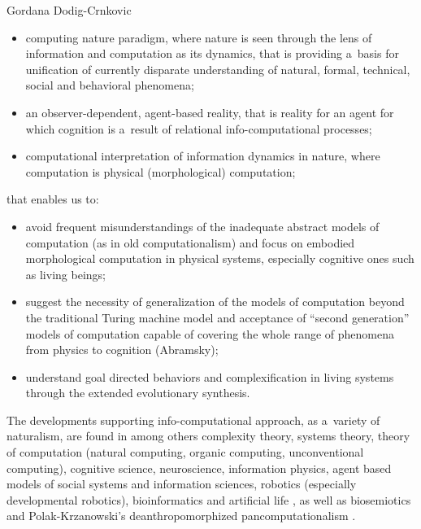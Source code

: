 \begin{artengenv}{Gordana Dodig-Crnkovic}
\begin{itemize}
\item 
computing nature paradigm, where nature is seen through the lens of information and computation as its dynamics, that is providing a~basis for unification of currently disparate understanding of natural, formal, technical, social and behavioral phenomena;
\item an observer-dependent, agent-based reality, that is reality for an agent for which cognition is a~result of relational info-computational processes;
\item 
computational interpretation of information dynamics in nature, where computation is physical (morphological) computation;
\end{itemize}
that enables us to:

\begin{itemize}
\item
avoid frequent misunderstandings of the inadequate abstract models of computation (as in old computationalism) and focus on embodied morphological computation in physical systems, especially cognitive ones such as living beings;
\item suggest the necessity of generalization of the models of computation beyond the traditional Turing machine model and acceptance of ``second generation'' models of computation capable of covering the whole range of phenomena from physics to cognition (Abramsky);
\item understand goal directed behaviors and complexification in living systems through the extended evolutionary synthesis.
\end{itemize}
The developments supporting info-computational approach, as a~variety of naturalism, are found in among others complexity theory, systems theory, theory of computation (natural computing, organic computing, unconventional computing), cognitive science, neuroscience, information physics, agent based models of social systems and information sciences, robotics (especially developmental robotics), bioinformatics and artificial life
\parencites[][]{dodig-crnkovic_dialogue_2011}[][]{dodig-crnkovic_nature_2017}, %
 as well as biosemiotics 
\parencite[][]{sarosiek_role_2021} %
 and Polak-Krzanowski's deanthropomorphized pancomputationalism 
\parencite[][]{polak_deanthropomorphized_2019}.%



\end{artengenv}
